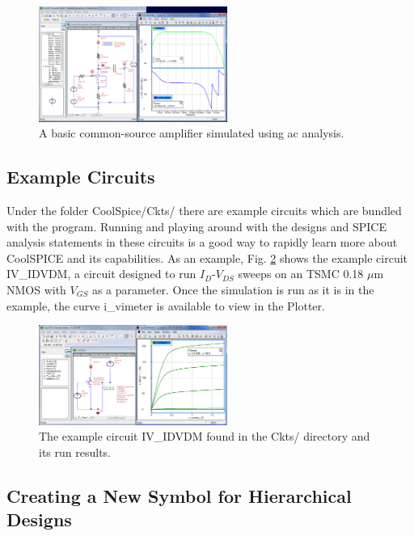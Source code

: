 \begin{figure}[hbt]
\centering
  \includegraphics[width=0.55\textwidth]
	{./figures/getting_started_figures/CoolSPICE_examplesimulation_ac.png}
  \caption{A basic common-source amplifier simulated using ac analysis.}
  \label{fig_acsimexample}
\end{figure}

%
\subsection{Example Circuits}

Under the folder \textsf{CoolSpice/Ckts/} there are example circuits which are bundled with the program.  Running and playing around with the designs and SPICE analysis statements in these circuits is a good way to rapidly learn more about CoolSPICE and its capabilities.  As an example, Fig. \ref{fig_examplecircuitrunresult} shows the example circuit \textsf{IV\_IDVDM}, a circuit designed to run $I_{D}$-$V_{DS}$ sweeps on an TSMC 0.18 $\mu$m NMOS with $V_{GS}$ as a parameter.  Once the simulation is run as it is in the example, the curve \textsf{i\_vimeter} is available to  view in the Plotter.

\begin{figure}[hbt]
\centering
  \includegraphics[width=0.55\textwidth]
	{./figures/getting_started_figures/CoolSPICE_examplecircuit_IV_IDVDM.png}
  \caption{The example circuit \textsf{IV\_IDVDM} found in the \textsf{Ckts/} directory and its run results.}
  \label{fig_examplecircuitrunresult}
\end{figure}

%
\subsection{Creating a New Symbol for Hierarchical Designs}
\label{subsec_iags_newsymbol}


